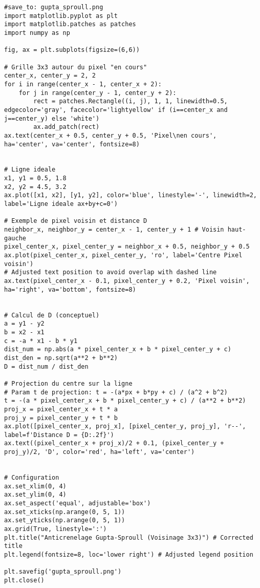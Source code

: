 \documentclass{article}
\begin{document}
\begin{verbatim}
#save_to: gupta_sproull.png
import matplotlib.pyplot as plt
import matplotlib.patches as patches
import numpy as np

fig, ax = plt.subplots(figsize=(6,6))

# Grille 3x3 autour du pixel "en cours"
center_x, center_y = 2, 2
for i in range(center_x - 1, center_x + 2):
    for j in range(center_y - 1, center_y + 2):
        rect = patches.Rectangle((i, j), 1, 1, linewidth=0.5, edgecolor='gray', facecolor='lightyellow' if (i==center_x and j==center_y) else 'white')
        ax.add_patch(rect)
ax.text(center_x + 0.5, center_y + 0.5, 'Pixel\nen cours', ha='center', va='center', fontsize=8)


# Ligne ideale
x1, y1 = 0.5, 1.8
x2, y2 = 4.5, 3.2
ax.plot([x1, x2], [y1, y2], color='blue', linestyle='-', linewidth=2, label='Ligne ideale ax+by+c=0')

# Exemple de pixel voisin et distance D
neighbor_x, neighbor_y = center_x - 1, center_y + 1 # Voisin haut-gauche
pixel_center_x, pixel_center_y = neighbor_x + 0.5, neighbor_y + 0.5
ax.plot(pixel_center_x, pixel_center_y, 'ro', label='Centre Pixel voisin')
# Adjusted text position to avoid overlap with dashed line
ax.text(pixel_center_x - 0.1, pixel_center_y + 0.2, 'Pixel voisin', ha='right', va='bottom', fontsize=8)


# Calcul de D (conceptuel)
a = y1 - y2
b = x2 - x1
c = -a * x1 - b * y1
dist_num = np.abs(a * pixel_center_x + b * pixel_center_y + c)
dist_den = np.sqrt(a**2 + b**2)
D = dist_num / dist_den

# Projection du centre sur la ligne
# Param t de projection: t = -(a*px + b*py + c) / (a^2 + b^2)
t = -(a * pixel_center_x + b * pixel_center_y + c) / (a**2 + b**2)
proj_x = pixel_center_x + t * a
proj_y = pixel_center_y + t * b
ax.plot([pixel_center_x, proj_x], [pixel_center_y, proj_y], 'r--', label=f'Distance D = {D:.2f}')
ax.text((pixel_center_x + proj_x)/2 + 0.1, (pixel_center_y + proj_y)/2, 'D', color='red', ha='left', va='center')


# Configuration
ax.set_xlim(0, 4)
ax.set_ylim(0, 4)
ax.set_aspect('equal', adjustable='box')
ax.set_xticks(np.arange(0, 5, 1))
ax.set_yticks(np.arange(0, 5, 1))
ax.grid(True, linestyle=':')
plt.title("Anticrenelage Gupta-Sproull (Voisinage 3x3)") # Corrected title
plt.legend(fontsize=8, loc='lower right') # Adjusted legend position

plt.savefig('gupta_sproull.png')
plt.close()
\end{verbatim}
\end{document}
